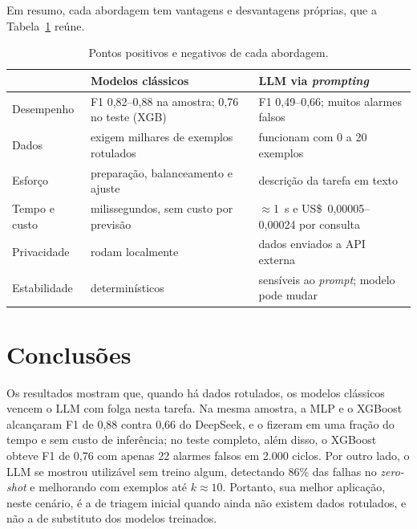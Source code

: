 \documentclass[12pt]{article}
\begin{document}
Em resumo, cada abordagem tem vantagens e desvantagens próprias, que a Tabela~\ref{tab:pros} reúne.

\begin{table}[ht]
\centering
\caption{Pontos positivos e negativos de cada abordagem.}
\label{tab:pros}
\footnotesize
\begin{tabular}{>{\raggedright}p{2.6cm}>{\raggedright}p{5.3cm}>{\raggedright\arraybackslash}p{5.3cm}}
\toprule
 & Modelos clássicos & LLM via \textit{prompting} \\
\midrule
Desempenho & F1 0,82--0,88 na amostra; 0,76 no teste (XGB) & F1 0,49--0,66; muitos alarmes falsos \\
Dados & exigem milhares de exemplos rotulados & funcionam com 0 a 20 exemplos \\
Esforço & preparação, balanceamento e ajuste & descrição da tarefa em texto \\
Tempo e custo & milissegundos, sem custo por previsão & $\approx$1~s e US\$~0,00005--0,00024 por consulta \\
Privacidade & rodam localmente & dados enviados a API externa \\
Estabilidade & determinísticos & sensíveis ao \textit{prompt}; modelo pode mudar \\
\bottomrule
\end{tabular}
\end{table}

\section{Conclusões}\label{sec:conclusao}

Os resultados mostram que, quando há dados rotulados, os modelos clássicos vencem o LLM com folga nesta tarefa. Na mesma amostra, a MLP e o XGBoost alcançaram F1 de 0,88 contra 0,66 do DeepSeek, e o fizeram em uma fração do tempo e sem custo de inferência; no teste completo, além disso, o XGBoost obteve F1 de 0,76 com apenas 22 alarmes falsos em 2.000 ciclos. Por outro lado, o LLM se mostrou utilizável sem treino algum, detectando 86\% das falhas no \textit{zero-shot} e melhorando com exemplos até $k\approx10$. Portanto, sua melhor aplicação, neste cenário, é a de triagem inicial quando ainda não existem dados rotulados, e não a de substituto dos modelos treinados.
\end{document}

